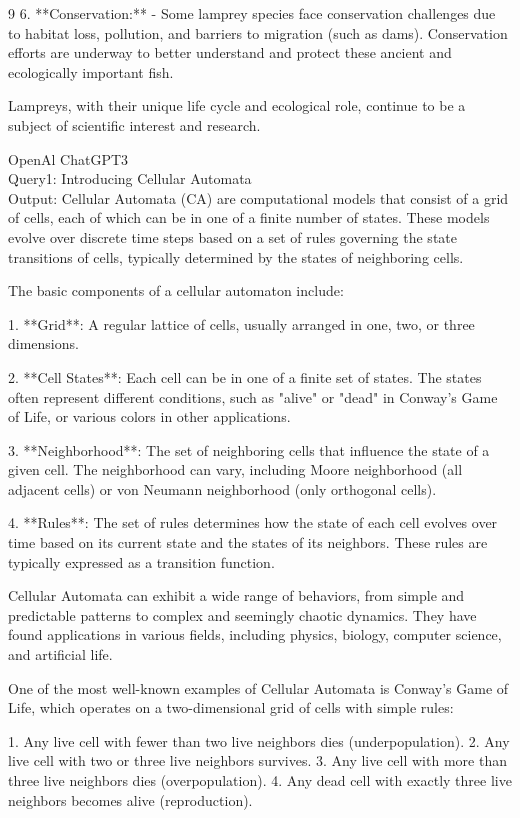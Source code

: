 \documentclass[CTeX = true]{mcmthesis}  %
\begin{document}
\begin{ReportAiUse}{9}
6. **Conservation:**
   - Some lamprey species face conservation challenges due to habitat loss, pollution, and barriers to migration (such as dams). Conservation efforts are underway to better understand and protect these ancient and ecologically important fish.

Lampreys, with their unique life cycle and ecological role, continue to be a subject of scientific interest and research.

OpenAl ChatGPT3\\
Query1: Introducing Cellular Automata\\
Output: Cellular Automata (CA) are computational models that consist of a grid of cells, each of which can be in one of a finite number of states. These models evolve over discrete time steps based on a set of rules governing the state transitions of cells, typically determined by the states of neighboring cells.

The basic components of a cellular automaton include:

1. **Grid**: A regular lattice of cells, usually arranged in one, two, or three dimensions.

2. **Cell States**: Each cell can be in one of a finite set of states. The states often represent different conditions, such as "alive" or "dead" in Conway's Game of Life, or various colors in other applications.

3. **Neighborhood**: The set of neighboring cells that influence the state of a given cell. The neighborhood can vary, including Moore neighborhood (all adjacent cells) or von Neumann neighborhood (only orthogonal cells).

4. **Rules**: The set of rules determines how the state of each cell evolves over time based on its current state and the states of its neighbors. These rules are typically expressed as a transition function.

Cellular Automata can exhibit a wide range of behaviors, from simple and predictable patterns to complex and seemingly chaotic dynamics. They have found applications in various fields, including physics, biology, computer science, and artificial life.

One of the most well-known examples of Cellular Automata is Conway's Game of Life, which operates on a two-dimensional grid of cells with simple rules:

1. Any live cell with fewer than two live neighbors dies (underpopulation).
2. Any live cell with two or three live neighbors survives.
3. Any live cell with more than three live neighbors dies (overpopulation).
4. Any dead cell with exactly three live neighbors becomes alive (reproduction).


\end{ReportAiUse}
\end{document}

